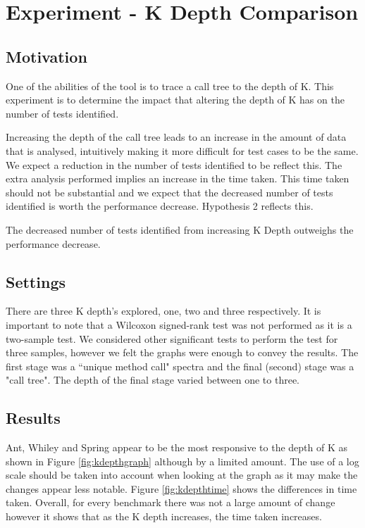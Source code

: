 \section{Experiment  - K Depth Comparison}
\label{kdepthcomp}
\subsection{Motivation}
One of the abilities of the tool is to trace a call tree to the depth of K. This experiment is to determine the impact that altering the depth of K has on the number of tests identified. 

Increasing the depth of the call tree leads to an increase in the amount of data that is analysed, intuitively making it more difficult for test cases to be the same. We expect a reduction in the number of tests identified to be reflect this. The extra analysis performed implies an increase in the time taken. This time taken should not be substantial and we expect that the decreased number of tests identified is worth the performance decrease. Hypothesis 2 reflects this.

\begin{hyp}
The decreased number of tests identified from increasing K Depth outweighs the performance decrease.
\end{hyp}

\subsection{Settings}
There are three K depth's explored, one, two and three respectively. It is important to note that a Wilcoxon signed-rank test was not performed as it is a two-sample test. We considered other significant tests to perform the test for three samples, however we felt the graphs were enough to convey the results. The first stage was a ``unique method call" spectra and the final (second) stage was a "call tree". The depth of the final stage varied between one to three.


\subsection{Results}
Ant, Whiley and Spring appear to be the most responsive to the depth of K as shown in Figure \ref{fig:kdepthgraph} although by a limited amount. The use of a log scale should be taken into account when looking at the graph as it may make the changes appear less notable. Figure \ref{fig:kdepthtime} shows the differences in time taken. Overall, for every benchmark there was not a large amount of change however it shows that as the K depth increases, the time taken increases. 

